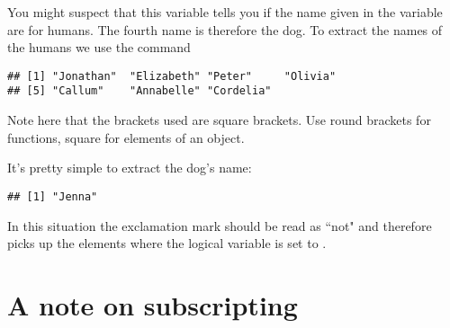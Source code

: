 \begin{knitrout}
\color{fgcolor}\begin{kframe}
\begin{alltt}
 \hlkwb{=} \hlstd{(}\hlstd{,} \hlstd{,} \hlstd{,} \hlstd{,} \hlstd{,} \hlstd{,} \hlstd{,} \hlstd{)}
\end{alltt}
\end{kframe}
\end{knitrout}
You might suspect that this variable tells you if the name given in the  variable are for humans. The fourth name is therefore the dog. To extract the names of the humans we use the command 
\begin{knitrout}
\color{fgcolor}\begin{kframe}
\begin{alltt}
\end{alltt}
\begin{verbatim}
## [1] "Jonathan"  "Elizabeth" "Peter"     "Olivia"   
## [5] "Callum"    "Annabelle" "Cordelia"
\end{verbatim}
\end{kframe}
\end{knitrout}
Note here that the brackets used are square brackets. Use round brackets for functions, square for elements of an object. 
 
It's pretty simple to extract the dog's name: 
\begin{knitrout}
\color{fgcolor}\begin{kframe}
\begin{alltt}
\hlstd{Names[}\hlopt{!}\hlstd{Human]}
\end{alltt}
\begin{verbatim}
## [1] "Jenna"
\end{verbatim}
\end{kframe}
\end{knitrout}
In this situation the exclamation mark should be read as ``not" and therefore picks up the elements where the logical variable is set to . 
 
\section{A note on subscripting} 
 
